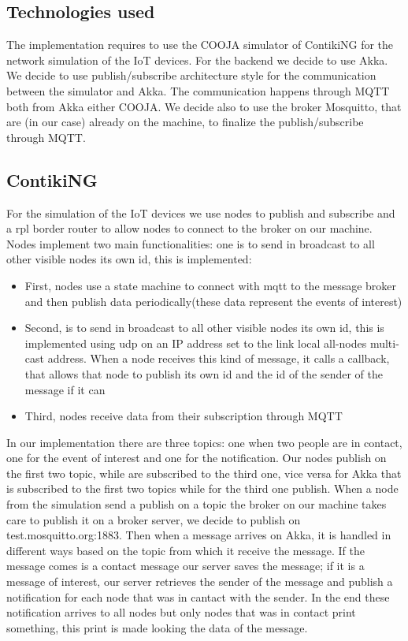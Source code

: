 \documentclass[10pt]{article}
\begin{document}
	\subsection{Technologies used}
	The implementation requires to use the COOJA simulator of ContikiNG for the network simulation of the IoT devices. For the backend we decide to use Akka. We decide to use publish/subscribe architecture style for the communication between the simulator and Akka. The communication happens through MQTT both from Akka either COOJA. We decide also to use the broker Mosquitto, that are (in our case) already on the machine, to finalize the publish/subscribe through MQTT.
	
	\subsection{ContikiNG}
	For the simulation of the IoT devices we use nodes to publish and subscribe and a rpl border router to allow nodes to connect to the broker on our machine. Nodes implement two main functionalities:
	one is to send in broadcast to all other visible nodes its own id, this is implemented:
	
	\begin{itemize}
		\item 	First,  nodes use a state machine to connect with mqtt to the message broker and then publish data periodically(these data represent the events of interest)      
		\item   Second,	 is to send in broadcast to all other visible nodes its own id, this is implemented using udp on an IP address set to the link local all-nodes multi-cast address. When a node receives this kind of message, it calls a callback, that allows that node to publish its own id and the id of the sender of the message if it can
		\item	Third, nodes receive data from their subscription  through MQTT	
	\end{itemize}
	
	In our implementation there are three topics: one when two people are in contact, one for the event of interest and one for the notification. Our nodes publish on the first two topic, while are subscribed to the third one, vice versa for Akka that is subscribed to the first two topics while for the third one publish. When a node from the simulation send a publish on a topic the broker on our machine takes care to publish it on a broker server, we decide to publish on test.mosquitto.org:1883. Then when a message arrives on Akka, it is handled in different ways based on the topic from which it receive the message. If the message comes is a contact message our server saves the message; if it is a message of interest, our server retrieves the sender of the message and publish a notification for each node that was in cantact with the sender. In the end these notification arrives to all nodes but only nodes that was in contact print something, this print is made looking the data of the message.
	
\end{document}
